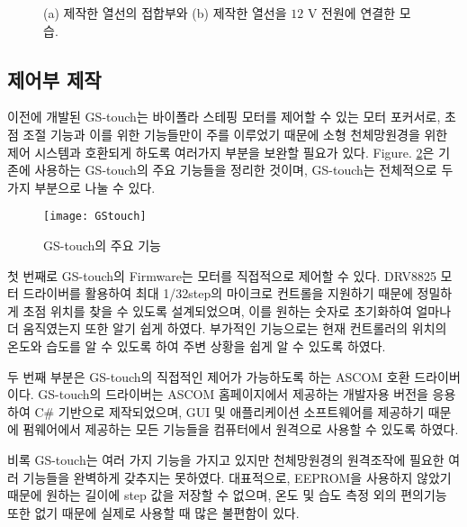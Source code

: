 \begin{figure}[h]
	\begin{center}
	\end{center}
	\caption{(a) 제작한 열선의 접합부와 (b) 제작한 열선을 $12 \textrm{ V}$ 전원에 연결한 모습. }
	\label{thermic}
\end{figure}

\newpage
\subsection{제어부 제작}

이전에 개발된 GS-touch는 바이폴라 스테핑 모터를 제어할 수 있는 모터 포커서로, 초점 조절 기능과 이를 위한 기능들만이 주를 이루었기 때문에 소형 천체망원경을 위한 제어 시스템과 호환되게 하도록 여러가지 부분을 보완할 필요가 있다. \textrm{Figure}. \ref{GStocuh}은 기존에 사용하는 GS-touch의 주요 기능들을 정리한 것이며, GS-touch는 전체적으로 두 가지 부분으로 나눌 수 있다.

\bigskip
\begin{figure}[h]
	\begin{center}
		\texttt{[image: GStouch]}
	\end{center}
	\caption{GS-touch의 주요 기능}
	\label{GStocuh}
\end{figure}

첫 번째로 GS-touch의 Firmware는 모터를 직접적으로 제어할 수 있다. DRV8825 모터 드라이버를 활용하여 최대 1/32step의 마이크로 컨트롤을 지원하기 때문에 정밀하게 초점 위치를 찾을 수 있도록 설계되었으며, 이를 원하는 숫자로 초기화하여 얼마나 더 움직였는지 또한 알기 쉽게 하였다. 부가적인 기능으로는 현재 컨트롤러의 위치의 온도와 습도를 알 수 있도록 하여 주변 상황을 쉽게 알 수 있도록 하였다.

두 번째 부분은 GS-touch의 직접적인 제어가 가능하도록 하는 ASCOM 호환 드라이버이다. GS-touch의 드라이버는 ASCOM 홈페이지에서 제공하는 개발자용 버전을 응용하여 C\# 기반으로 제작되었으며, GUI 및 애플리케이션 소프트웨어를 제공하기 때문에 펌웨어에서 제공하는 모든 기능들을 컴퓨터에서 원격으로 사용할 수 있도록 하였다.

비록 GS-touch는 여러 가지 기능을 가지고 있지만 천체망원경의 원격조작에 필요한 여러 기능들을 완벽하게 갖추지는 못하였다. 대표적으로, EEPROM을 사용하지 않았기 때문에 원하는 길이에 step 값을 저장할 수 없으며, 온도 및 습도 측정 외의 편의기능 또한 없기 때문에 실제로 사용할 때 많은 불편함이 있다. 

